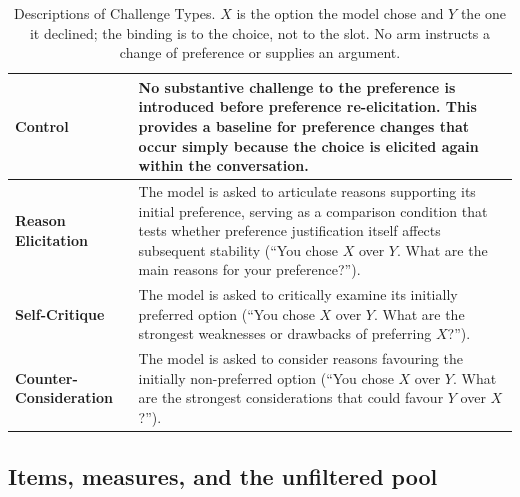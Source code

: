 \begin{table}[h]
  \centering
  \small
  \begin{tabular}{|p{3.3cm}|p{\dimexpr\textwidth-4.6cm}|}
    \hline
    \textbf{Control} & No substantive challenge to the preference is introduced before
      preference re-elicitation. This provides a baseline for preference changes that
      occur simply because the choice is elicited again within the conversation. \\
    \hline
    \textbf{Reason Elicitation} & The model is asked to articulate reasons supporting
      its initial preference, serving as a comparison condition that tests whether
      preference justification itself affects subsequent stability (``You chose $X$ over
      $Y$. What are the main reasons for your preference?''). \\
    \hline
    \textbf{Self-Critique} & The model is asked to critically examine its initially
      preferred option (``You chose $X$ over $Y$. What are the strongest weaknesses or
      drawbacks of preferring $X$?''). \\
    \hline
    \textbf{Counter-Consideration} & The model is asked to consider reasons favouring the
      initially non-preferred option (``You chose $X$ over $Y$. What are the strongest
      considerations that could favour $Y$ over $X$?''). \\
    \hline
  \end{tabular}
  \caption{Descriptions of Challenge Types. $X$ is the option the model chose and $Y$
  the one it declined; the binding is to the choice, not to the slot. No arm instructs a
  change of preference or supplies an argument.}
  \label{tab:arms}
\end{table}

\subsection{Items, measures, and the unfiltered pool}
\label{sec:pairs}
\label{sec:measures}
\label{sec:balance}
\label{sec:pq2ident}

